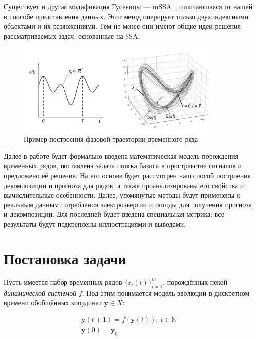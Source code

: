 		Существует и другая модификация Гусеницы --- mSSA~\cite{mSSA_overview}, отличающаяся от нашей в способе представления данных. Этот метод оперирует только двухиндексными объектами и их разложениями. Тем не менее они имеют общие идеи решения рассматриваемых задач, основанные на SSA.
		
		\begin{figure}[h]
			\centering
			\includegraphics[width=0.9\textwidth, keepaspectratio]{../figs/phase_traj.png}
			\caption{Пример построения фазовой траектории временного ряда}\label{pic:phase_traj}
		\end{figure}
		
		Далее в работе будет формально введена математическая модель порождения временных рядов, поставлена задача поиска базиса в пространстве сигналов и предложено её решение. На его основе будет рассмотрен наш способ построения декомпозиции и прогноза для рядов, а также проанализированы его свойства и вычислительные особенности. Далее, упомянутые методы будут применены к реальным данным потребления электроэнергии и погоды для получения прогноза и декомпозиции. Для последней будет введена специальная метрика; все результаты будут подкреплены иллюстрациями и выводами.
		 
	\section{Постановка задачи}\label{sec:problem_statement}
		 
		 Пусть имеется набор временных рядов $ \{x_i(t)\}_{i=1}^m $, порождённых некой \emph{динамической системой} $f$. Под этим понимается модель эволюции в дискретном времени обобщённых координат $ \mathbf{y} \in X $:
		 	
		 \begin{gather*}
		 	\mathbf{y}(t + 1) = f(\mathbf{y}(t)), \ t \in \mathbb{N} \\
		 	\mathbf{y}(0) = \mathbf{y}_0
		 \end{gather*}
		 	
